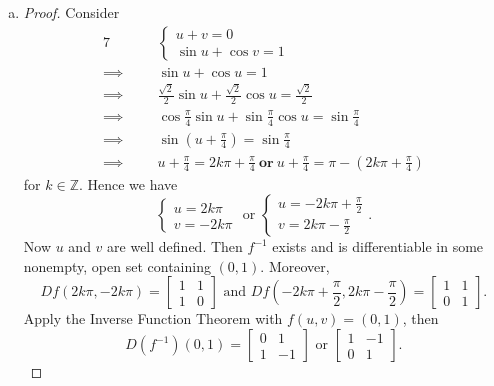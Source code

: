 \begin{Exercise}
\begin{enumerate}[a)]
\item
\begin{proof}
Consider
\begin{alignat*}{7}
\quad&& &\begin{cases} 
u+v=0 \\ 
\sin u+\cos v=1
\end{cases} \\
\implies&& &\sin u +\cos u = 1 \\
\implies&& &\frac{\sqrt{2}}{2}\sin u +\frac{\sqrt{2}}{2}\cos u = \frac{\sqrt{2}}{2} \\
\implies&& &\cos\frac{\pi}{4}\sin u + \sin\frac{\pi}{4}\cos u = \sin\frac{\pi}{4} \\
\implies&& &\sin(u+\frac{\pi}{4}) = \sin\frac{\pi}{4} \\
\implies&& &u+\frac{\pi}{4} = 2k\pi + \frac{\pi}{4}\mathbf{\ or\ }u+\frac{\pi}{4} = \pi-\left( 2k\pi+\frac{\pi}{4} \right)
\end{alignat*}
for $k\in\mathbb{Z}$. Hence we have
$$
\begin{cases}
u=2k\pi \\
v=-2k\pi
\end{cases} \text{ or }
\begin{cases}
u=-2k\pi+\frac{\pi}{2} \\
v=2k\pi-\frac{\pi}{2}
\end{cases}.
$$
Now $u$ and $v$ are well defined. Then $f^{-1}$ exists and is differentiable in some nonempty, open set containing $(0,1)$. Moreover,
$$
D f(2k\pi,-2k\pi) = \begin{bmatrix}
1 & 1 \\
1 & 0
\end{bmatrix}\text{ and }
D f(-2k\pi+\frac{\pi}{2}, 2k\pi-\frac{\pi}{2}) = \begin{bmatrix}
1 & 1 \\
0 & 1
\end{bmatrix}.
$$
Apply the Inverse Function Theorem with $f(u,v) = (0,1)$, then
$$
D (f^{-1})(0,1) = \begin{bmatrix}
0 & 1 \\
1 & -1
\end{bmatrix}\text{ or }
\begin{bmatrix}
1 & -1 \\
0 & 1
\end{bmatrix}.
$$
\end{proof}
\end{enumerate}
\end{Exercise}
